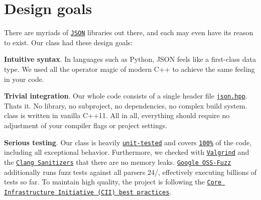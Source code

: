 \chapter{Design goals }
\hypertarget{md_include_2nlohman_2json-develop_2docs_2mkdocs_2docs_2home_2design__goals}{}\label{md_include_2nlohman_2json-develop_2docs_2mkdocs_2docs_2home_2design__goals}
\label{md_include_2nlohman_2json-develop_2docs_2mkdocs_2docs_2home_2design__goals_autotoc_md1576}%
%


There are myriads of \href{https://json.org}{\texttt{JSON}} libraries out there, and each may even have its reason to exist. Our class had these design goals:\+


\begin{DoxyItemize}
\item {\bfseries{Intuitive syntax}}. In languages such as Python, JSON feels like a first-\/class data type. We used all the operator magic of modern C++ to achieve the same feeling in your code.
\item {\bfseries{Trivial integration}}. Our whole code consists of a single header file \href{https://github.com/nlohmann/json/blob/develop/single_include/nlohmann/json.hpp}{\texttt{{\ttfamily json.\+hpp}}}. That\textquotesingle{}s it. No library, no subproject, no dependencies, no complex build system.  class is written in vanilla C++11. All in all, everything should require no adjustment of your compiler flags or project settings.
\item {\bfseries{Serious testing}}. Our class is heavily \href{https://github.com/nlohmann/json/tree/develop/tests/src}{\texttt{unit-\/tested}} and covers \href{https://coveralls.io/r/nlohmann/json}{\texttt{100\%}} of the code, including all exceptional behavior. Furthermore, we checked with \href{http://valgrind.org}{\texttt{Valgrind}} and the \href{https://clang.llvm.org/docs/index.html}{\texttt{Clang Sanitizers}} that there are no memory leaks. \href{https://github.com/google/oss-fuzz/tree/master/projects/json}{\texttt{Google OSS-\/\+Fuzz}} additionally runs fuzz tests against all parsers 24/, effectively executing billions of tests so far. To maintain high quality, the project is following the \href{https://bestpractices.coreinfrastructure.org/projects/289}{\texttt{Core Infrastructure Initiative (CII) best practices}}.
\end{DoxyItemize}

